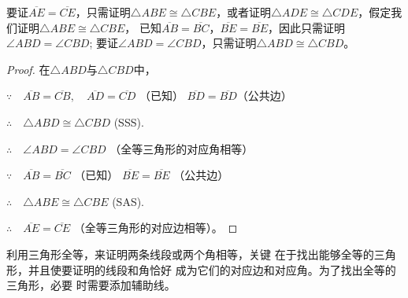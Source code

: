 \begin{analyze}
    要证$\overline{AE}=\overline{CE}$，只需证明$\triangle ABE\cong \triangle CBE$，或者证明$\triangle ADE\cong \triangle CDE$，假定我们证明$\triangle ABE\cong \triangle CBE$，
    已知$\overline{AB}=\overline{BC}$，$\overline{BE}=\overline{BE}$，因此只需证明$\angle ABD=\angle CBD$;
    要证$\angle ABD=\angle CBD$，只需证明$\triangle ABD\cong\triangle CBD$。
\end{analyze}

\begin{proof}
    在$\triangle ABD$与$\triangle CBD$中，

    $\because\quad \overline{AB}=\overline{CB},\quad \overline{AD}=\overline{CD}$ （已知）   $\overline{BD}=\overline{BD}$（公共边）

    $\therefore\quad \triangle ABD\cong \triangle CBD$ (SSS).

    $\therefore\quad \angle ABD=\angle CBD$ （全等三角形的对应角相等）

$\because\quad     \overline{AB}=\overline{BC}$ （已知） 
    $\overline{BE}=\overline{BE}$ （公共边）

$\therefore\quad \triangle ABE\cong \triangle CBE$ (SAS).

$\therefore\quad \overline{AE}=\overline{CE}$ （全等三角形的对应边相等）。
\end{proof}

    利用三角形全等，来证明两条线段或两个角相等，关键
    在于找出能够全等的三角形，并且使要证明的线段和角恰好
    成为它们的对应边和对应角。为了找出全等的三角形，必要
    时需要添加辅助线。  

